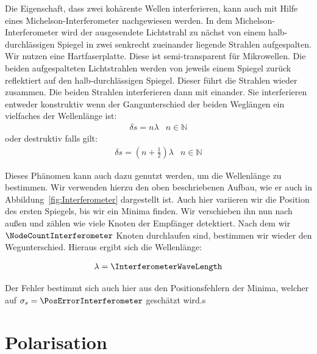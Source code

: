 \documentclass[a4paper,10pt,twocolumn]{article}
\begin{document}
    Die Eigenschaft, dass zwei kohärente Wellen interferieren, kann auch mit Hilfe eines Michelson-Interferometer
    nachgewiesen werden.
    In dem Michelson-Interferometer wird der ausgesendete Lichtstrahl zu nächst von einem halb-durchlässigen
    Spiegel in zwei senkrecht zueinander liegende Strahlen aufgespalten.
    Wir nutzen eine Hartfaserplatte.
    Diese ist semi-transparent für Mikrowellen.
    Die beiden aufgespalteten Lichtstrahlen werden von jeweils einem Spiegel zurück reflektiert auf den
    halb-durchlässigen Spiegel.
    Dieser führt die Strahlen wieder zusammen.
    Die beiden Strahlen interferieren dann mit einander.
    Sie interferieren entweder konstruktiv wenn der Gangunterschied der beiden Weglängen ein vielfaches der Wellenlänge ist:
    \begin{align*}
        \delta s = n \lambda & n \in \mathds{N}
    \end{align*}
    oder destruktiv falls gilt:
    \begin{align*}
        \delta s = (n + \frac{1}{2}) \lambda & n \in \mathds{N}
    \end{align*}
    
    Dieses Phänomen kann auch dazu genutzt werden, um die Wellenlänge zu bestimmen.
    Wir verwenden hierzu den oben beschriebenen Aufbau, wie er auch in Abbildung~\ref{fig:Interferometer}
    dargestellt ist.
    Auch hier variieren wir die Position des ersten Spiegels, bis wir ein Minima finden.
    Wir verschieben ihn nun nach außen und zählen wie viele Knoten der Empfänger detektiert.
    Nach dem wir $\NodeCountInterferometer$ Knoten durchlaufen sind, bestimmen wir wieder den
    Wegunterschied.
    Hieraus ergibt sich die Wellenlänge:
    
    \begin{align*}
        \lambda = \InterferometerWaveLength
    \end{align*}
    
    Der Fehler bestimmt sich auch hier aus den Positionsfehlern der Minima, welcher
    auf $\sigma_s = \PosErrorInterferometer$ geschätzt wird.s
    
    \section{Polarisation}

    
\end{document}
